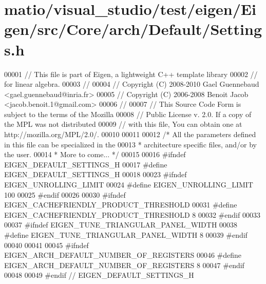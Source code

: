 \hypertarget{matio_2visual__studio_2test_2eigen_2_eigen_2src_2_core_2arch_2_default_2_settings_8h_source}{}\section{matio/visual\+\_\+studio/test/eigen/\+Eigen/src/\+Core/arch/\+Default/\+Settings.h}
\label{matio_2visual__studio_2test_2eigen_2_eigen_2src_2_core_2arch_2_default_2_settings_8h_source}

\begin{DoxyCode}
00001 \textcolor{comment}{// This file is part of Eigen, a lightweight C++ template library}
00002 \textcolor{comment}{// for linear algebra.}
00003 \textcolor{comment}{//}
00004 \textcolor{comment}{// Copyright (C) 2008-2010 Gael Guennebaud <gael.guennebaud@inria.fr>}
00005 \textcolor{comment}{// Copyright (C) 2006-2008 Benoit Jacob <jacob.benoit.1@gmail.com>}
00006 \textcolor{comment}{//}
00007 \textcolor{comment}{// This Source Code Form is subject to the terms of the Mozilla}
00008 \textcolor{comment}{// Public License v. 2.0. If a copy of the MPL was not distributed}
00009 \textcolor{comment}{// with this file, You can obtain one at http://mozilla.org/MPL/2.0/.}
00010 
00011 
00012 \textcolor{comment}{/* All the parameters defined in this file can be specialized in the}
00013 \textcolor{comment}{ * architecture specific files, and/or by the user.}
00014 \textcolor{comment}{ * More to come... */}
00015 
00016 \textcolor{preprocessor}{#ifndef EIGEN\_DEFAULT\_SETTINGS\_H}
00017 \textcolor{preprocessor}{#define EIGEN\_DEFAULT\_SETTINGS\_H}
00018 
00023 \textcolor{preprocessor}{#ifndef EIGEN\_UNROLLING\_LIMIT}
00024 \textcolor{preprocessor}{#define EIGEN\_UNROLLING\_LIMIT 100}
00025 \textcolor{preprocessor}{#endif}
00026 
00030 \textcolor{preprocessor}{#ifndef EIGEN\_CACHEFRIENDLY\_PRODUCT\_THRESHOLD}
00031 \textcolor{preprocessor}{#define EIGEN\_CACHEFRIENDLY\_PRODUCT\_THRESHOLD 8}
00032 \textcolor{preprocessor}{#endif}
00033 
00037 \textcolor{preprocessor}{#ifndef EIGEN\_TUNE\_TRIANGULAR\_PANEL\_WIDTH}
00038 \textcolor{preprocessor}{#define EIGEN\_TUNE\_TRIANGULAR\_PANEL\_WIDTH 8}
00039 \textcolor{preprocessor}{#endif}
00040 
00041 
00045 \textcolor{preprocessor}{#ifndef EIGEN\_ARCH\_DEFAULT\_NUMBER\_OF\_REGISTERS}
00046 \textcolor{preprocessor}{#define EIGEN\_ARCH\_DEFAULT\_NUMBER\_OF\_REGISTERS 8}
00047 \textcolor{preprocessor}{#endif}
00048 
00049 \textcolor{preprocessor}{#endif // EIGEN\_DEFAULT\_SETTINGS\_H}
\end{DoxyCode}

